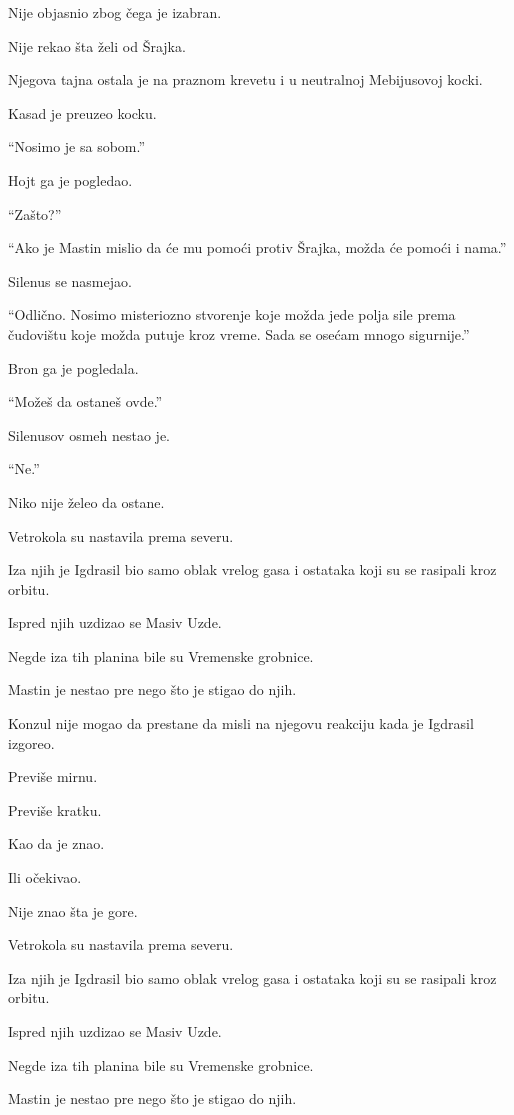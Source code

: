 Nije objasnio zbog čega je izabran.

Nije rekao šta želi od Šrajka.

Njegova tajna ostala je na praznom krevetu i u neutralnoj Mebijusovoj kocki.

Kasad je preuzeo kocku.

``Nosimo je sa sobom.''

Hojt ga je pogledao.

``Zašto?''

``Ako je Mastin mislio da će mu pomoći protiv Šrajka, možda će pomoći i nama.''

Silenus se nasmejao.

``Odlično. Nosimo misteriozno stvorenje koje možda jede polja sile prema čudovištu koje možda putuje kroz vreme. Sada se osećam mnogo sigurnije.''

Bron ga je pogledala.

``Možeš da ostaneš ovde.''

Silenusov osmeh nestao je.

``Ne.''

Niko nije želeo da ostane.

\bigskip

Vetrokola su nastavila prema severu.

Iza njih je Igdrasil bio samo oblak vrelog gasa i ostataka koji su se rasipali kroz orbitu.

Ispred njih uzdizao se Masiv Uzde.

Negde iza tih planina bile su Vremenske grobnice.

Mastin je nestao pre nego što je stigao do njih.

Konzul nije mogao da prestane da misli na njegovu reakciju kada je Igdrasil izgoreo.

Previše mirnu.

Previše kratku.

Kao da je znao.

Ili očekivao.

Nije znao šta je gore.

\bigskip

Vetrokola su nastavila prema severu.

Iza njih je Igdrasil bio samo oblak vrelog gasa i ostataka koji su se rasipali kroz orbitu.

Ispred njih uzdizao se Masiv Uzde.

Negde iza tih planina bile su Vremenske grobnice.

Mastin je nestao pre nego što je stigao do njih.

